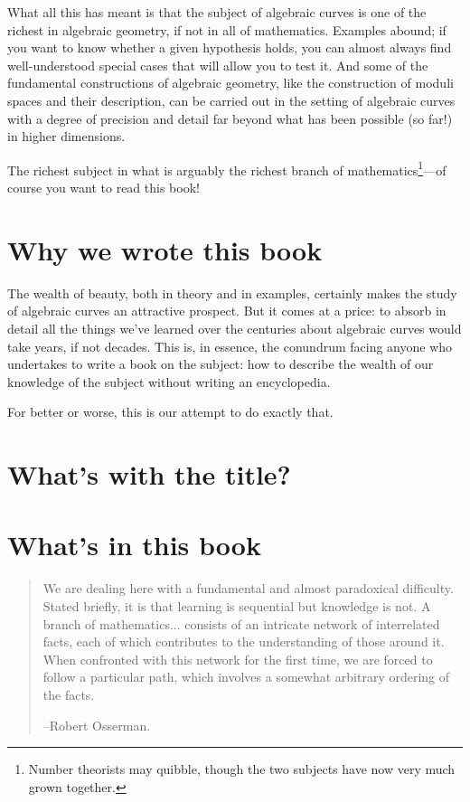 What all this has meant is that the subject of algebraic curves is one of the richest in algebraic geometry, if not in all of mathematics. Examples abound; if you want to know whether a given hypothesis holds, you can almost always find well-understood special cases that will allow you to test it. And some of the fundamental constructions of algebraic geometry, like the construction of moduli spaces and their description, can be carried out in the setting of algebraic curves with a degree of precision and detail far beyond what has been possible (so far!) in higher dimensions. 

The richest subject in what is arguably the richest branch of mathematics\footnote{Number theorists may quibble, though the two subjects have now very much grown together.}---of course you want to read this book! 

\section{Why we wrote this book}

The wealth of beauty, both in theory and in examples, certainly makes the study of algebraic curves an attractive prospect. But it comes at a price: to absorb in detail all the things we've learned over the centuries about algebraic curves would take years, if not decades. This is, in essence, the conundrum facing anyone who undertakes to write a book on the subject: how to describe the wealth of our knowledge of the subject without writing an encyclopedia.

For better or worse, this is our attempt to do exactly that.

\section{What's with the title?}




\section{What's in this book}


\begin{quote}
\small\sf
We are dealing here with a fundamental and almost paradoxical difficulty. Stated briefly, it is that learning is sequential but knowledge is not. A branch of mathematics... consists of an intricate network  of interrelated facts, each of which contributes to the understanding of those around it. When confronted with this network for the first time, we are forced to follow a particular path, which involves a somewhat arbitrary ordering of the facts.

--Robert Osserman.

\end{quote}



